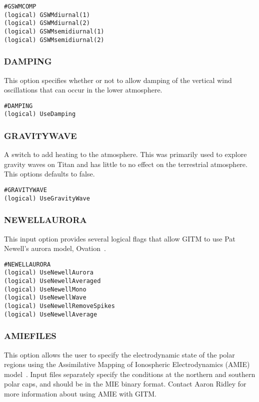 \begin{verbatim}
#GSWMCOMP
(logical) GSWMdiurnal(1)        
(logical) GSWMdiurnal(2)       
(logical) GSWMsemidiurnal(1)    
(logical) GSWMsemidiurnal(2)    
\end{verbatim}

\subsubsection{DAMPING}
\label{damping.sec}

This option specifies whether or not to allow damping of the vertical wind oscillations that can occur in the lower atmosphere.

\begin{verbatim}
#DAMPING
(logical) UseDamping        
\end{verbatim}

\subsubsection{GRAVITYWAVE}
\label{gravitywave.sec}
A switch to add heating to the atmosphere.  This was primarily used to explore gravity waves on Titan and has little to no effect on the terrestrial atmosphere.  This options defaults to false.

\begin{verbatim}
#GRAVITYWAVE
(logical) UseGravityWave
\end{verbatim}

\subsubsection{NEWELLAURORA}
\label{newellaurora.sec}

This input option provides several logical flags that allow GITM to use Pat Newell's aurora model, Ovation~\citep{Newell:2002ov}.

\begin{verbatim}
#NEWELLAURORA
(logical) UseNewellAurora   
(logical) UseNewellAveraged 
(logical) UseNewellMono 
(logical) UseNewellWave
(logical) UseNewellRemoveSpikes 
(logical) UseNewellAverage  
\end{verbatim}

\subsubsection{AMIEFILES}
\label{amiefiles.sec}

This option allows the user to specify the electrodynamic state of the polar regions using the Assimilative Mapping of Ionospheric Electrodynamics (AMIE) model~\citep{ridley:2004aa}.  Input files separately specify the conditions at the northern and southern polar caps, and should be in the MIE binary format.  Contact Aaron Ridley for more information about using AMIE with GITM.

